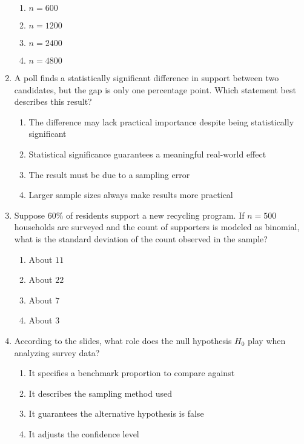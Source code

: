 \documentclass{article}
\begin{document}
\begin{enumerate}
\begin{enumerate}[label=(\Alph*)]
  \item $n=600$
  \item $n=1200$
  \item $n=2400$
  \item $n=4800$
  \end{enumerate}
\item A poll finds a statistically significant difference in support between two candidates, but the gap is only one percentage point. Which statement best describes this result?
  \begin{enumerate}[label=(\Alph*)]
  \item The difference may lack practical importance despite being statistically significant
  \item Statistical significance guarantees a meaningful real-world effect
  \item The result must be due to a sampling error
  \item Larger sample sizes always make results more practical
  \end{enumerate}
\item Suppose $60\%$ of residents support a new recycling program. If $n=500$ households are surveyed and the count of supporters is modeled as binomial, what is the standard deviation of the count observed in the sample?
  \begin{enumerate}[label=(\Alph*)]
  \item About $11$
  \item About $22$
  \item About $7$
  \item About $3$
  \end{enumerate}
\item According to the slides, what role does the null hypothesis $H_0$ play when analyzing survey data?
  \begin{enumerate}[label=(\Alph*)]
  \item It specifies a benchmark proportion to compare against
  \item It describes the sampling method used
  \item It guarantees the alternative hypothesis is false
  \item It adjusts the confidence level
  \end{enumerate}
\end{enumerate}
\end{document}
